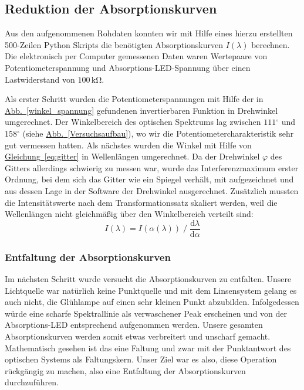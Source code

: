 \documentclass[11pt]{scrartcl}
\newcommand{\unit}[1]{\ensuremath{\,\mathrm{#1}}} %
\newcommand{\degr}{\ensuremath{^\circ}}
\newcommand{\dif}{\ensuremath{\mathrm{d}}}
\newcommand{\hypref}[2]{\hyperref[#2]{{#1}~\ref{#2}}}
\begin{document}
\FloatBarrier
\subsection{Reduktion der Absorptionskurven}
Aus den aufgenommenen Rohdaten konnten wir mit Hilfe eines hierzu erstellten 500-Zeilen Python Skripts die benötigten Absorptionskurven $I(\lambda)$ berechnen.
Die elektronisch per Computer gemessenen Daten waren Wertepaare von Potentiometerspannung und Absorptions-LED-Spannung über einen Lastwiderstand von $100\unit{k\Omega}$.

Als erster Schritt wurden die Potentiometerspannungen mit Hilfe der in \hypref{Abb.}{winkel_spannung} gefundenen invertierbaren Funktion in Drehwinkel umgerechnet.
Der Winkelbereich des optischen Spektrums lag zwischen $111\degr$ und $158\degr$ (siehe \hypref{Abb.}{Versuchsaufbau}), wo wir die Potentiometercharakteristik sehr gut vermessen hatten.
Als nächstes wurden die Winkel mit Hilfe von \hypref{Gleichung}{eq:gitter} in Wellenlängen umgerechnet. Da der Drehwinkel $\varphi$ des Gitters allerdings schwierig zu messen war, wurde das Interferenzmaximum erster Ordnung, bei dem sich das Gitter wie ein Spiegel verhält, mit aufgezeichnet und aus dessen Lage in der Software der Drehwinkel ausgerechnet. Zusätzlich mussten die Intensitätswerte nach dem Transformationssatz skaliert werden, weil die Wellenlängen nicht gleichmäßig über den Winkelbereich verteilt sind:
\begin{equation}
I(\lambda) = I(\alpha(\lambda)) \;/\; \frac{\dif\lambda}{\dif\alpha}
\end{equation}

\subsubsection{Entfaltung der Absorptionskurven}\label{sec:entfaltung}
Im nächsten Schritt wurde versucht die Absorptionskurven zu entfalten.
Unsere Lichtquelle war natürlich keine Punktquelle und mit dem Linsensystem gelang es auch nicht, die Glühlampe auf einen sehr kleinen Punkt abzubilden.
Infolgedessen würde eine scharfe Spektrallinie als verwaschener Peak erscheinen und von der Absorptions-LED entsprechend aufgenommen werden. Unsere gesamten Absorptionskurven werden somit etwas verbreitert und unscharf gemacht.
Mathematisch gesehen ist das eine Faltung und zwar mit der Punktantwort des optischen Systems als Faltungskern.
Unser Ziel war es also, diese Operation rückgängig zu machen, also eine Entfaltung der Absorptionskurven durchzuführen.
\end{document}
